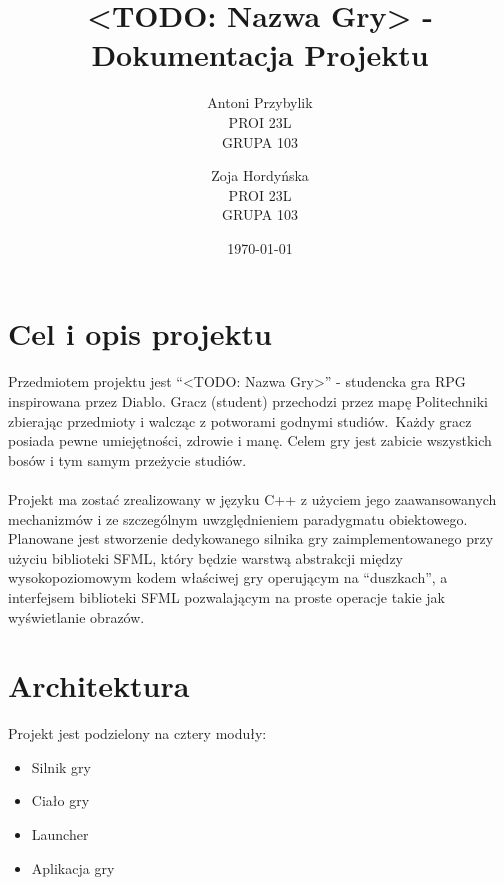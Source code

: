 \documentclass[12pt, titlepage]{article}
\author{Antoni Przybylik \\ PROI 23L \\ GRUPA 103 \and
	Zoja Hordyńska \\ PROI 23L \\ GRUPA 103}
\date{\today}
\title{<TODO: Nazwa Gry> - Dokumentacja Projektu}
\begin{document}
\maketitle
\justifying



\lstset{style=listingstyle}

\section{Cel i opis projektu}
Przedmiotem projektu jest "`<TODO: Nazwa Gry>"' - studencka
gra RPG inspirowana przez Diablo. Gracz (student) przechodzi
przez mapę Politechniki zbierając przedmioty i walcząc z potworami
godnymi studiów. Każdy gracz posiada pewne umiejętności,
zdrowie i manę. Celem gry jest zabicie wszystkich bosów
i tym samym przeżycie studiów.
\\~\\
Projekt ma zostać zrealizowany w języku C++ z użyciem
jego zaawansowanych mechanizmów i ze szczególnym uwzględnieniem
paradygmatu obiektowego. Planowane jest stworzenie
dedykowanego silnika gry zaimplementowanego przy użyciu
biblioteki SFML, który będzie warstwą abstrakcji między
wysokopoziomowym kodem właściwej gry operującym na "`duszkach"',
a interfejsem biblioteki SFML pozwalającym na proste operacje
takie jak wyświetlanie obrazów.

\section{Architektura}
Projekt jest podzielony na cztery moduły:
\begin{itemize}
	\item Silnik gry
	\item Ciało gry
	\item Launcher
	\item Aplikacja gry
\end{itemize}
\end{document}
